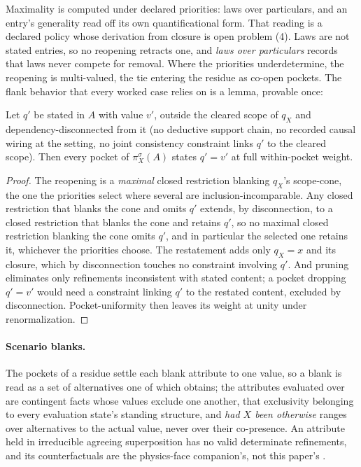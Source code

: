 \noindent Maximality is computed under declared priorities: laws over particulars, and an entry's generality read off its own quantificational form. That reading is a declared policy whose derivation from closure is open problem (4). Laws are not stated entries, so no reopening retracts one, and \emph{laws over particulars} records that laws never compete for removal. Where the priorities underdetermine, the reopening is multi-valued, the tie entering the residue as co-open pockets. The flank behavior that every worked case relies on is a lemma, provable once:
\begin{lemma}[Conservativity]\label{lem:conservativity}
Let $q'$ be stated in $A$ with value $v'$, outside the cleared scope of $q_X$ and dependency-disconnected from it (no deductive support chain, no recorded causal wiring at the setting, no joint consistency constraint links $q'$ to the cleared scope). Then every pocket of $\pi^{\sigma}_X(A)$ states $q' = v'$ at full within-pocket weight.
\end{lemma}
\begin{proof}
The reopening is a \emph{maximal} closed restriction blanking $q_X$'s scope-cone, the one the priorities select where several are inclusion-incomparable. Any closed restriction that blanks the cone and omits $q'$ extends, by disconnection, to a closed restriction that blanks the cone and retains $q'$, so no maximal closed restriction blanking the cone omits $q'$, and in particular the selected one retains it, whichever the priorities choose. The restatement adds only $q_X = x$ and its closure, which by disconnection touches no constraint involving $q'$. And pruning eliminates only refinements inconsistent with stated content; a pocket dropping $q' = v'$ would need a constraint linking $q'$ to the restated content, excluded by disconnection. Pocket-uniformity then leaves its weight at unity under renormalization.
\end{proof}

\paragraph{Scenario blanks.} The pockets of a residue settle each blank attribute to one value, so a blank is read as a set of alternatives one of which obtains; the attributes evaluated over are contingent facts whose values exclude one another, that exclusivity belonging to every evaluation state's standing structure, and \emph{had $X$ been otherwise} ranges over alternatives to the actual value, never over their co-presence. An attribute held in irreducible agreeing superposition has no valid determinate refinements, and its counterfactuals are the physics-face companion's, not this paper's \parencite{Aethus, AethusQuant}.

